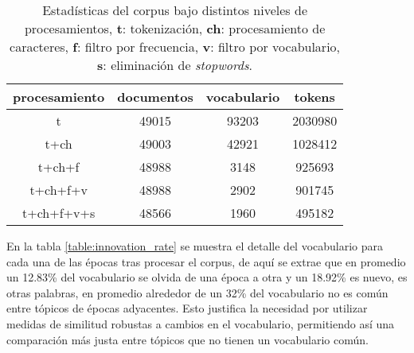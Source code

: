\begin{table}[H]
    \begin{tabular}{|c|c|c|c|}
    \hline
    procesamiento & documentos & vocabulario & tokens  \\ \hline
    t             & 49015      & 93203       & 2030980 \\ \hline
    t+ch          & 49003      & 42921       & 1028412 \\ \hline
    t+ch+f        & 48988      & 3148        & 925693  \\ \hline
    t+ch+f+v      & 48988      & 2902        & 901745  \\ \hline
    t+ch+f+v+s      & 48566      & 1960        & 495182  \\ \hline
    \end{tabular}
    \caption{Estadísticas del corpus bajo distintos niveles de procesamientos, \textbf{t}: tokenización, \textbf{ch}: procesamiento de caracteres, \textbf{f}: filtro por frecuencia, \textbf{v}: filtro por vocabulario, \textbf{s}: eliminación de \textit{stopwords}.}
    \label{table:processing_stats}
    \end{table}


En la tabla \ref{table:innovation_rate} se muestra el detalle del vocabulario para cada una de las épocas tras procesar el corpus, de aquí se extrae que en promedio un 12.83\% del vocabulario se olvida de una época a otra y un 18.92\% es nuevo, es otras palabras, en promedio alrededor de un 32\% del vocabulario no es común entre tópicos de épocas adyacentes. Esto justifica la necesidad por utilizar medidas de similitud robustas a cambios en el vocabulario, permitiendo así una comparación más justa entre tópicos que no tienen un vocabulario común.


